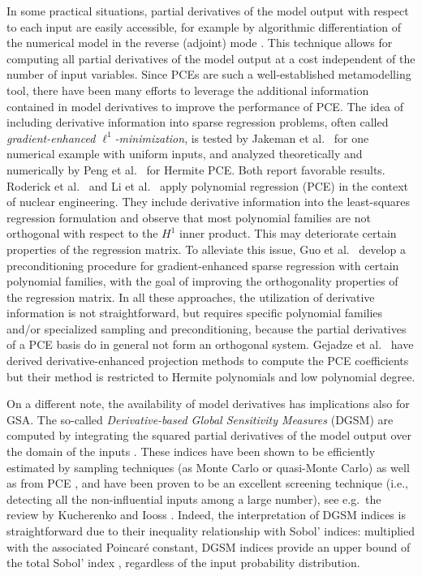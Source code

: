 \documentclass[a4paper,11pt]{article}
\renewcommand{\citep}[2][]{\cite[#1]{#2}}
\renewcommand{\citet}[2][]{\cite[#1]{#2}}
\theoremstyle{definition}
\theoremstyle{remark}
\theoremstyle{theorem}
\begin{document}
In some practical situations, partial derivatives of the model output with respect to each input are easily accessible, for example by algorithmic differentiation of the numerical model in the reverse (adjoint) mode \citep{griwal08}. This technique allows for computing all partial derivatives of the model output at a cost independent of the number of input variables.
Since PCEs are such a well-established metamodelling tool, there have been many efforts to leverage the additional information contained in model derivatives to improve the performance of PCE. 
The idea of including derivative information into sparse regression problems, often called \textit{gradient-enhanced $\ell^1$-minimization}, 
is tested by Jakeman et al.~\cite{Jakeman2015} for one numerical example with uniform inputs, and analyzed theoretically and numerically by Peng et al.~\cite{penham16} for Hermite PCE. Both report favorable results. 
Roderick et al.~\citet{rodani10} and Li et al.~\citet{liani11} apply polynomial regression (PCE) in the context of nuclear engineering. They include derivative information into the least-squares regression formulation and observe 
that most polynomial families are not orthogonal with respect to the $H^1$ inner product. This may deteriorate certain properties of the regression matrix.
To alleviate this issue, Guo et al.~\cite{Guo2018} develop a preconditioning procedure for gradient-enhanced sparse regression with certain polynomial families, with the goal of improving the orthogonality properties of the regression matrix.
In all these approaches, the utilization of derivative information is not straightforward, but requires specific polynomial families and/or specialized sampling and preconditioning, because the partial derivatives of a PCE basis do in general not form an orthogonal system.
Gejadze et al.~\citet{gejmal19} have derived derivative-enhanced projection methods to compute the PCE coefficients but their method is restricted to Hermite polynomials and low polynomial degree.


On a different note, the availability of model derivatives has implications also for GSA. 
The so-called \textit{Derivative-based Global Sensitivity Measures} (DGSM) are computed by integrating the squared partial derivatives of the model output 
over the domain of the inputs \citep{Sobol_Gresham_1995,Sobol2009}. 
These indices have been shown to be efficiently estimated by sampling techniques (as Monte Carlo or quasi-Monte Carlo) \citep{Kucherenko2009} as well as from PCE \citep{sudmai15}, and have been proven to be an excellent screening technique (i.e., detecting all the non-influential inputs among a large number), see e.g.\ the review by Kucherenko and Iooss \cite{kucioo17}.
Indeed, the interpretation of DGSM indices is straightforward due to their inequality relationship with Sobol' indices: multiplied with the associated Poincar\'e constant, DGSM indices provide an upper bound of the total Sobol' index \citep{Lamboni_et_al_2013}, regardless of the input probability distribution.
\end{document}
